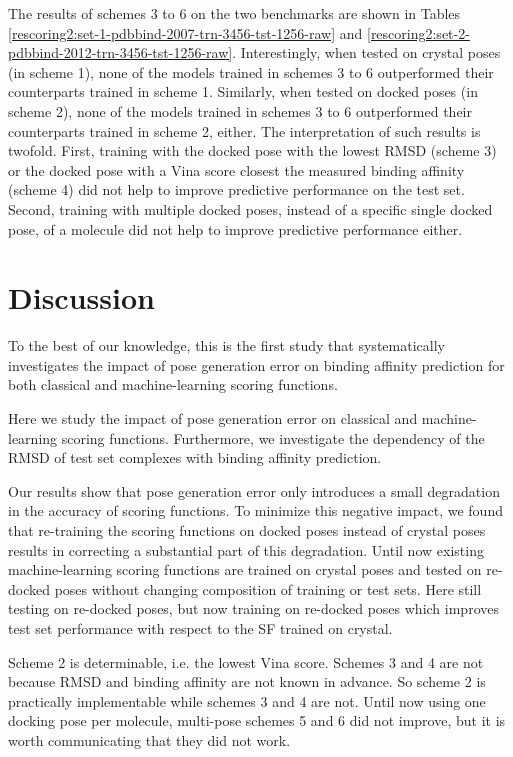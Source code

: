 \documentclass[twocolumn]{bmcart}
\begin{document}
The results of schemes 3 to 6 on the two benchmarks are shown in Tables \ref{rescoring2:set-1-pdbbind-2007-trn-3456-tst-1256-raw} and \ref{rescoring2:set-2-pdbbind-2012-trn-3456-tst-1256-raw}. Interestingly, when tested on crystal poses (in scheme 1), none of the models trained in schemes 3 to 6 outperformed their counterparts trained in scheme 1. Similarly, when tested on docked poses (in scheme 2), none of the models trained in schemes 3 to 6 outperformed their counterparts trained in scheme 2, either. The interpretation of such results is twofold. First, training with the docked pose with the lowest RMSD (scheme 3) or the docked pose with a Vina score closest the measured binding affinity (scheme 4) did not help to improve predictive performance on the test set. Second, training with multiple docked poses, instead of a specific single docked pose, of a molecule did not help to improve predictive performance either.

\section*{Discussion}

To the best of our knowledge, this is the first study that systematically investigates the impact of pose generation error on binding affinity prediction for both classical and machine-learning scoring functions.

Here we study the impact of pose generation error on classical and machine-learning scoring functions. Furthermore, we investigate the dependency of the RMSD of test set complexes with binding affinity prediction. %

Our results show that pose generation error only introduces a small degradation in the accuracy of scoring functions. To minimize this negative impact, we found that re-training the scoring functions on docked poses instead of crystal poses results in correcting a substantial part of this degradation. Until now existing machine-learning scoring functions are trained on crystal poses and tested on re-docked poses without changing composition of training or test sets. Here still testing on re-docked poses, but now training on re-docked poses which improves test set performance with respect to the SF trained on crystal.

Scheme 2 is determinable, i.e. the lowest Vina score. Schemes 3 and 4 are not because RMSD and binding affinity are not known in advance. So scheme 2 is practically implementable while schemes 3 and 4 are not. Until now using one docking pose per molecule, multi-pose schemes 5 and 6 did not improve, but it is worth communicating that they did not work.
\end{document}

